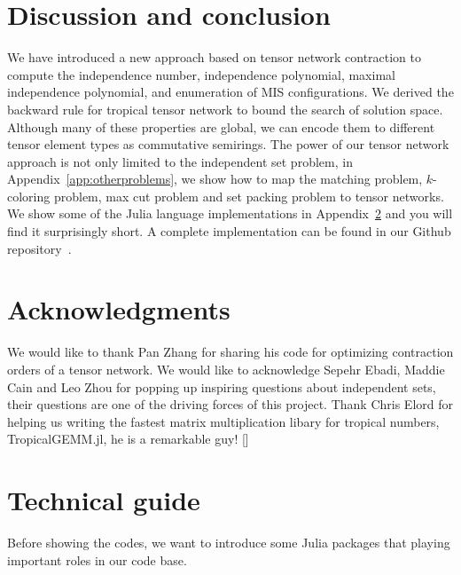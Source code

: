 \documentclass[onefignum, onetabnum]{siamart190516}
\newcommand{\<}{\langle}
\renewcommand{\>}{\rangle}
\newcommand{\App}[1]{Appendix~\ref{#1}}
\newcommand{\blue}[1]{[{\bf  \color{blue}{JG: #1}}]}
\begin{document}
\section{Discussion and conclusion}
We have introduced a new approach based on tensor network contraction to compute the independence number, independence polynomial, maximal independence polynomial, and enumeration of MIS configurations.
We derived the backward rule for tropical tensor network to bound the search of solution space.
Although many of these properties are global, we can encode them to different tensor element types as commutative semirings.
The power of our tensor network approach is not only limited to the independent set problem, in \App{app:otherproblems}, we show how to map the matching problem, $k$-coloring problem, max cut problem and set packing problem to tensor networks.
We show some of the Julia language implementations in Appendix~\ref{sec:technical} and you will find it surprisingly short.
A complete implementation can be found in our Github repository~\cite{GraphTensorNetworks}.

\section*{Acknowledgments}
We would like to thank Pan Zhang for sharing his code for optimizing contraction orders of a tensor network.
We would like to acknowledge Sepehr Ebadi, Maddie Cain and Leo Zhou for popping up inspiring questions about independent sets,
their questions are one of the driving forces of this project.
Thank Chris Elord for helping us writing the fastest matrix multiplication libary for tropical numbers, TropicalGEMM.jl, he is a remarkable guy!
\blue{funding information}




\appendix

\section{Technical guide}\label{sec:technical}
Before showing the codes,
we want to introduce some Julia packages that playing important roles in our code base.
\end{document}
